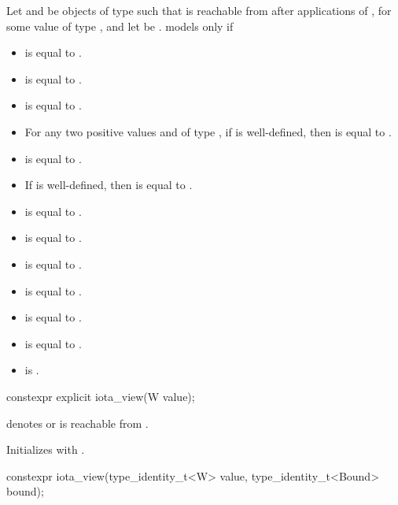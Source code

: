 Let  and  be objects of type  such that
 is reachable from 
after  applications of ,
for some value  of type ,
and let  be .
 models  only if
\begin{itemize}
\item {} is equal to .
\item {} is equal to .
\item {} is equal to .
\item For any two positive values
   and  of type ,
  if  is well-defined, then
   is equal to .
\item {} is equal to .
\item If  is well-defined, then
   is equal to .
\item {} is equal to .
\item {} is equal to .
\item {} is equal to .
\item {} is equal to .
\item {} is equal to .
\item {} is equal to .
\item {} is .
\end{itemize}

%
\begin{itemdecl}
constexpr explicit iota_view(W value);
\end{itemdecl}

\begin{itemdescr}
\pnum
\expects
{} denotes  or
 is reachable from .

\pnum
\effects Initializes  with .
\end{itemdescr}

%
\begin{itemdecl}
constexpr iota_view(type_identity_t<W> value, type_identity_t<Bound> bound);
\end{itemdecl}

